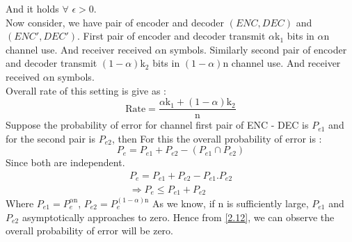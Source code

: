 \documentclass{article}
\begin{document}
 And it holds $\forall$ $\epsilon > 0 $.\\ 
Now consider, we have pair of encoder and decoder $\left( ENC, DEC\right)$ and $\left( ENC', DEC'\right)$. First pair of encoder and decoder transmit $\alpha$k$_{1}$  bits in $\alpha$n channel use. And receiver received $\alpha$n symbols. Similarly second pair of  encoder and decoder transmit $ \left (1 - \alpha \right)$k$_{2}$  bits in $ \left( 1 -\alpha \right)$n channel use. And receiver received $\alpha$n symbols. \\ Overall rate of this setting is give as :
\begin{equation} 
	\text{Rate} = \frac{ \alpha \text{k}_1 + (1 - \alpha)\text{k}_2}{\text{n}}
\end{equation}
Suppose the probability of error for channel first pair of ENC - DEC is $P_{e1}$ and for the second pair is $P_{e2}$, then
For this the overall probability of error  is :
\begin{equation}
	P_e = P_{e1} + P_{e2} -( P_{e1} \cap P_{e2})  \label{2.12}
\end{equation}
Since both are independent.
\begin{align}
	P_e = P_{e1} + P_{e2} - P_{e1}.P_{e2}  \label{2.13} \\
	\Rightarrow P_{e} \leq P_{e1} + P_{e2} \label{2.14}
\end{align}
Where $P_{e1} = P_{e}^{\alpha \text{n}}$, $P_{e2} = P_{e}^{\left (1 - \alpha \right ) \text{n}}$ 
As we know, if n is sufficiently large, $P_{e1}$ and $P_{e2}$ asymptotically approaches to zero. Hence from \ref{2.12}, we can observe the overall probability of error will be zero.



 
  
  
  
  
\end{document}
